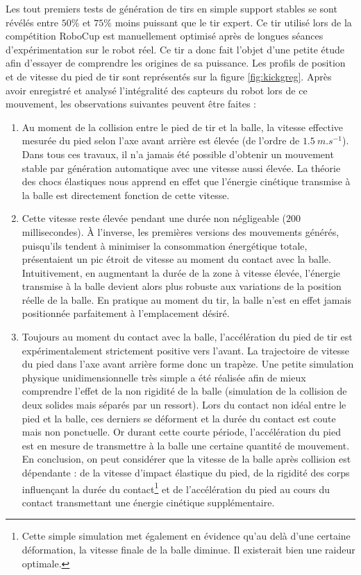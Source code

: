 Les tout premiers tests de génération de tirs en simple support
stables se sont révélés entre $50\%$ et $75\%$ moins puissant que le tir expert. 
Ce tir utilisé lors de la compétition RoboCup est manuellement optimisé après de
longues séances d'expérimentation sur le robot réel.
Ce tir a donc fait l'objet d'une petite étude afin d'essayer de comprendre
les origines de sa puissance.
Les profils de position et de vitesse du pied de tir sont représentés sur
la figure \ref{fig:kickgreg}.
Après avoir enregistré et analysé l'intégralité des capteurs du robot lors
de ce mouvement, les observations suivantes peuvent être faites :
\begin{enumerate}
    \item Au moment de la collision entre le pied de tir et la balle,
        la vitesse effective mesurée du pied selon l'axe avant arrière est élevée
        (de l'ordre de $1.5~m.s^{-1}$).
        Dans tous ces travaux, il n'a jamais été possible d'obtenir 
        un mouvement stable par génération automatique avec une vitesse 
        aussi élevée.
        La théorie des chocs élastiques nous apprend en effet que
        l'énergie cinétique transmise à la balle est directement 
        fonction de cette vitesse.
    \item Cette vitesse reste élevée pendant une durée non négligeable
        ($200$ millisecondes). À l'inverse, les premières versions
        des mouvements générés, puisqu'ils tendent à minimiser 
        la consommation énergétique totale,
        présentaient un pic étroit de vitesse au moment du contact avec la balle.
        Intuitivement, en augmentant la durée de la zone à vitesse élevée, l'énergie
        transmise à la balle devient alors plus robuste aux variations de la position 
        réelle de la balle.
        En pratique au moment du tir, la balle n'est en effet jamais positionnée 
        parfaitement à l'emplacement désiré. 
    \item Toujours au moment du contact avec la balle, l'accélération
        du pied de tir est expérimentalement strictement positive vers l'avant.
        La trajectoire de vitesse du pied dans l'axe avant arrière forme donc un trapèze.
        Une petite simulation physique unidimensionnelle très simple a été réalisée 
        afin de mieux comprendre l'effet de la non rigidité de la balle 
        (simulation de la collision de deux solides mais séparés par un ressort).
        Lors du contact non idéal entre le pied et la balle, ces derniers se déforment
        et la durée du contact est coute mais non ponctuelle.
        Or durant cette courte période, l'accélération du pied est en mesure 
        de transmettre à la balle une certaine quantité de mouvement.
        En conclusion, on peut considérer que la vitesse de la balle après collision est dépendante : 
        de la vitesse d'impact élastique du pied, 
        de la rigidité des corps influençant la durée du 
        contact\footnote{
            Cette simple simulation met également en évidence qu'au delà d'une 
            certaine déformation, la vitesse finale de la balle diminue. 
            Il existerait bien une raideur optimale.
        } 
        et de l'accélération du pied au cours du contact transmettant 
        une énergie cinétique supplémentaire.
\end{enumerate}
